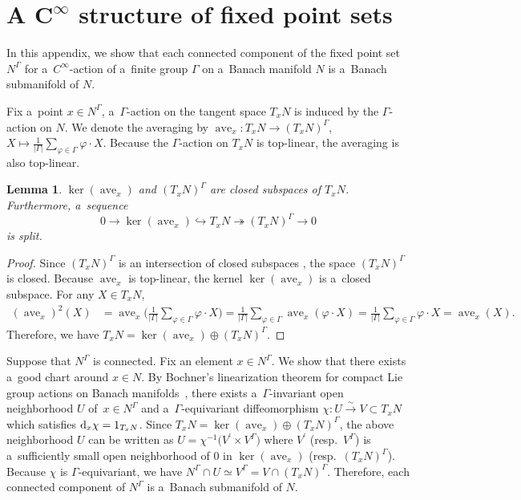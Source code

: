 \documentclass[pdftex]{sigma}
\numberwithin{equation}{section}
\newtheorem{Lemma}[Theorem]{Lemma}
\theoremstyle{definition}
\newcommand{\ave}{\operatorname{ave}}
\begin{document}
\section[A C\string^infty structure of fixed point sets]{A $\boldsymbol{C^{\infty}}$ structure of fixed point sets}\label{Appendix C}

In this appendix, we show that each connected component of the fixed point set $N^{\Gamma}$ for a~$C^{\infty}$-action of a~finite group $\Gamma$ on a~Banach manifold $N$ is a~Banach submanifold of $N$.

Fix a~point $x \in N^{\Gamma}$, a~$\Gamma$-action on the tangent space $T_xN$ is induced by the $\Gamma$-action on $N$.
We denote the averaging by $\ave_x \colon T_xN \to (T_xN)^{\Gamma}$, $ X \mapsto \frac{1}{|\Gamma|} \sum_{\varphi \in \Gamma} \varphi \cdot X$.
Because the $\Gamma$-action on $T_xN$ is top-linear, the averaging is also top-linear.

\begin{Lemma}
 $\ker (\ave_x)$ and $(T_xN)^{\Gamma}$ are closed subspaces of $T_xN$.
 Furthermore, a~sequence
 \[0 \to \ker(\ave_x) \hookrightarrow T_xN \twoheadrightarrow (T_xN)^{\Gamma} \to 0\]
 is split.
\end{Lemma}

\begin{proof}
 Since $(T_xN)^{\Gamma}$ is an intersection of closed subspaces ,
 the space $(T_xN)^{\Gamma}$ is closed.
 Because $\ave_x$ is top-linear, the kernel $\ker(\ave_x)$ is a~closed subspace.
 For any $X \in T_xN$,
 \begin{align*}
 (\ave_x)^2(X) &= \ave_x\bigg(\frac{1}{|\Gamma|}\sum_{\varphi \in \Gamma}\varphi\cdot X \bigg)
 = \frac{1}{|\Gamma|}\sum_{\varphi \in \Gamma} \ave_x(\varphi \cdot X)
 = \frac{1}{|\Gamma|} \sum_{\varphi \in \Gamma} \varphi \cdot X
 = \ave_x(X).
 \end{align*}
 Therefore, we have $T_xN = \ker(\ave_x) \oplus (T_xN)^{\Gamma}$.
\end{proof}

Suppose that $N^{\Gamma}$ is connected. Fix an element $x \in N^{\Gamma}$.
We show that there exists a~good chart around $x \in N$.
By Bochner's linearization theorem for compact Lie group actions on Banach manifolds~\cite[Proposition~3.1.4]{diez2019normal}, there exists a~$\Gamma$-invariant open neighborhood $U$ of~${x \in N^{\Gamma}}$
and a~$\Gamma$-equivariant diffeomorphism $\chi \colon U \stackrel{\sim}{\rightarrow} V \subset T_xN $ which satisfies ${\rm d}_x\chi =1_{T_xN}$.
Since $T_xN = \ker(\ave_x) \oplus (T_xN)^{\Gamma}$, the above neighborhood $U$ can be written as $ U= \chi^{-1}\bigl(V^{\prime}\times V^{\Gamma}\bigr)$
where $V^{\prime}$ \big(resp.\ $V^{\Gamma}$\big) is a~sufficiently small open neighborhood of $0$ in $\ker(\ave_x)$ \big(resp.\ $(T_xN)^{\Gamma}$\big).
Because $\chi$ is $\Gamma$-equivariant, we have $N^{\Gamma} \cap U \simeq V^{\Gamma} = V \cap (T_xN)^{\Gamma}$.
Therefore, each connected component of $N^{\Gamma}$ is a~Banach submanifold of $N$.
\end{document}
